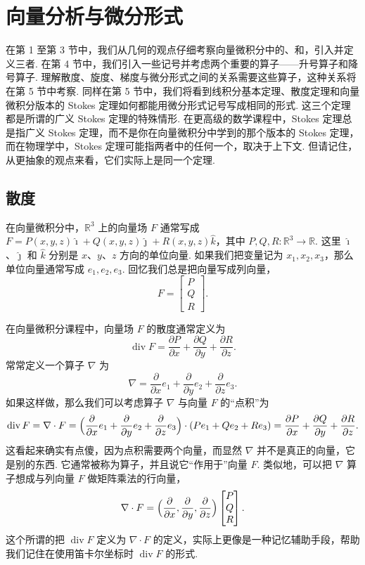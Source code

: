 \chapter{向量分析与微分形式}

在第 1 至第 3 节中，我们从几何的观点仔细考察向量微积分中的、和，引入并定义三者. 在第 4 节中，我们引入一些记号并考虑两个重要的算子——升号算子和降号算子. 理解散度、旋度、梯度与微分形式之间的关系需要这些算子，这种关系将在第 5 节中考察. 同样在第 5 节中，我们将看到线积分基本定理、散度定理和向量微积分版本的 Stokes 定理如何都能用微分形式记号写成相同的形式. 这三个定理都是所谓的广义 Stokes 定理的特殊情形. 在更高级的数学课程中，Stokes 定理总是指广义 Stokes 定理，而不是你在向量微积分中学到的那个版本的 Stokes 定理，而在物理学中，Stokes 定理可能指两者中的任何一个，取决于上下文. 但请记住，从更抽象的观点来看，它们实际上是同一个定理.

\section{散度}

在向量微积分中，$\mathbb{R}^3$ 上的向量场 $F$ 通常写成 $F=P(x,y,z)\hat{\imath}+Q(x,y,z)\hat{\jmath}+R(x,y,z)\hat{k}$，其中 $P,Q,R:\mathbb{R}^3\to\mathbb{R}$. 这里 $\hat{\imath}$、$\hat{\jmath}$ 和 $\hat{k}$ 分别是 $x$、$y$、$z$ 方向的单位向量. 如果我们把变量记为 $x_1,x_2,x_3$，那么单位向量通常写成 $e_1,e_2,e_3$. 回忆我们总是把向量写成列向量，
\[
F=\begin{bmatrix}P\\Q\\R\end{bmatrix}.
\]

在向量微积分课程中，向量场 $F$ 的散度通常定义为
\[
\operatorname{div}F=\frac{\partial P}{\partial x}+\frac{\partial Q}{\partial y}+\frac{\partial R}{\partial z}.
\]
常常定义一个算子 $\nabla$ 为
\[
\nabla=\frac{\partial}{\partial x}e_1+\frac{\partial}{\partial y}e_2+\frac{\partial}{\partial z}e_3.
\]
如果这样做，那么我们可以考虑算子 $\nabla$ 与向量 $F$ 的``点积''为
\[
\operatorname{div}F=\nabla\cdot F=\Bigl(\frac{\partial}{\partial x}e_1+\frac{\partial}{\partial y}e_2+\frac{\partial}{\partial z}e_3\Bigr)\cdot(Pe_1+Qe_2+Re_3)=\frac{\partial P}{\partial x}+\frac{\partial Q}{\partial y}+\frac{\partial R}{\partial z}.
\]
这看起来确实有点傻，因为点积需要两个向量，而显然 $\nabla$ 并不是真正的向量，它是别的东西. 它通常被称为算子，并且说它``作用于''向量 $F$. 类似地，可以把 $\nabla$ 算子想成与列向量 $F$ 做矩阵乘法的行向量，
\[
\nabla\cdot F=\Bigl(\frac{\partial}{\partial x},\frac{\partial}{\partial y},\frac{\partial}{\partial z}\Bigr)\begin{bmatrix}P\\Q\\R\end{bmatrix}.
\]
这个所谓的把 $\operatorname{div}F$ 定义为 $\nabla\cdot F$ 的定义，实际上更像是一种记忆辅助手段，帮助我们记住在使用笛卡尔坐标时 $\operatorname{div}F$ 的形式.

